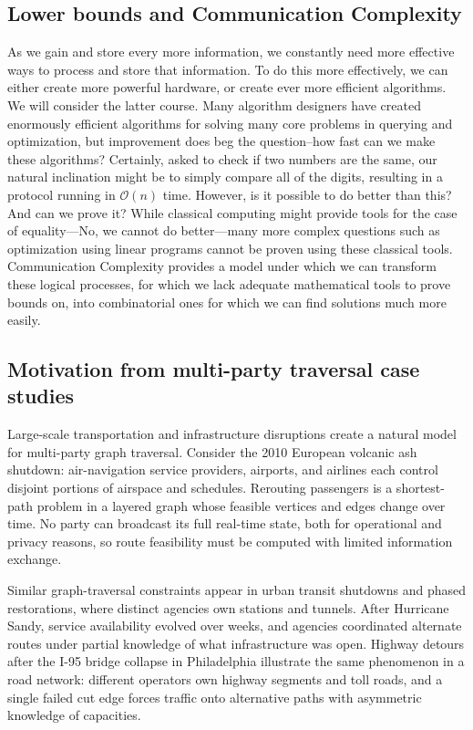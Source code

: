 \subsection{Lower bounds and Communication Complexity}
As we gain and store every more information, we constantly need more effective
ways to process and store that information. To do this more effectively, we can
either create more powerful hardware, or create ever more efficient algorithms.
We will consider the latter course. Many algorithm designers have created
enormously efficient algorithms for solving many core problems in querying and
optimization, but improvement does beg the question--how fast can we make these
algorithms? Certainly, asked to check if two numbers are the same, our
natural inclination might be to simply compare all of the digits, resulting in
a protocol running in $\mathcal{O}(n)$ time. However, is it possible to do
better than this? And can we prove it? While classical computing might provide
tools for the case of equality---No, we cannot do better---many more complex
questions such as optimization using linear programs cannot be proven using
these classical tools. Communication Complexity provides a model under which we
can transform these logical processes, for which we lack adequate mathematical
tools to prove bounds on, into combinatorial ones for which we can find
solutions much more easily.

\subsection{Motivation from multi-party traversal case studies}
Large-scale transportation and infrastructure disruptions create a natural model for multi-party graph traversal. Consider the 2010 European volcanic ash shutdown: air-navigation service providers, airports, and airlines each control disjoint portions of airspace and schedules. Rerouting passengers is a shortest-path problem in a layered graph whose feasible vertices and edges change over time. No party can broadcast its full real-time state, both for operational and privacy reasons, so route feasibility must be computed with limited information exchange.

Similar graph-traversal constraints appear in urban transit shutdowns and phased restorations, where distinct agencies own stations and tunnels. After Hurricane Sandy, service availability evolved over weeks, and agencies coordinated alternate routes under partial knowledge of what infrastructure was open. Highway detours after the I-95 bridge collapse in Philadelphia illustrate the same phenomenon in a road network: different operators own highway segments and toll roads, and a single failed cut edge forces traffic onto alternative paths with asymmetric knowledge of capacities.

